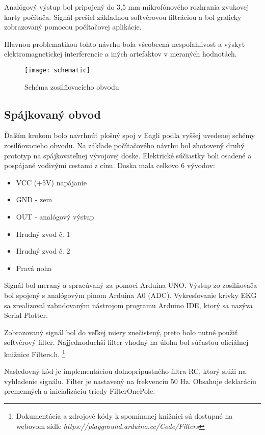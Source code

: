 \documentclass[titlepage]{article}
\begin{document}
Analógový výstup bol pripojený do 3,5 mm mikrofónového rozhrania zvukovej karty počítača. Signál prešiel základnou softvérovou filtráciou a bol graficky zobrazovaný pomocou počítačovej aplikácie.

Hlavnou problematikou tohto návrhu bola všeobecná nespoľahlivosť a výskyt elektromagnetickej interferencie a iných artefaktov v meraných hodnotách.


\begin{figure}[!ht]
\begin{center}
\texttt{[image: schematic]}
\caption{Schéma zosilňovacieho obvodu}
\end{center}
\end{figure}

\newpage
\subsection{Spájkovaný obvod}
Ďalším krokom bolo navrhnúť plošný spoj v Eagli podľa vyššej uvedenej schémy zosilňovacieho obvodu. Na základe počítačového návrhu bol zhotovený druhý prototyp na spájkovateľnej vývojovej doske. Elektrické súčiastky boli osadené a pospájané vodivými cestami z cínu. Doska mala celkovo 6 vývodov:
\begin{itemize}
	\item VCC (+5V) napájanie
	\item GND - zem
	\item OUT - analógový výstup
	\item Hrudný zvod č. 1
	\item Hrudný zvod č. 2
	\item Pravá noha
\end{itemize}
Signál bol meraný a spracúvaný za pomoci Arduina UNO. Výstup zo zosilňovača bol spojený s analógovým pinom Arduina A0 (ADC). Vykresľovanie krivky EKG sa zrealizoval zabudovaným nástrojom programu Arduino IDE, ktorý sa nazýva Serial Plotter.

Zobrazovaný signál bol do veľkej miery znečistený, preto bolo nutné použiť softvérový filter. Najjednoduchší filter vhodný na úlohu bol súčasťou oficiálnej knižnice Filters.h. \footnote{Dokumentácia a zdrojové kódy k spomínanej knižnici sú dostupné na webovom sídle \textit{https://playground.arduino.cc/Code/Filters}}

Nasledovný kód je implementáciou dolnopripustného filtra RC, ktorý slúži na vyhladenie signálu. Filter je nastavený na frekvenciu 50 Hz. Obsahuje deklaráciu premenných a inicializáciu triedy FilterOnePole.
\end{document}
